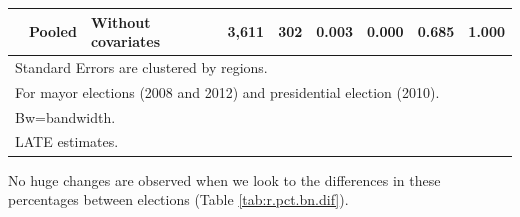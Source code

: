 \documentclass[
  12pt,
]{article}
\begin{document}
\begin{table}[H]
\begin{tabular}[t]{lllrrrrrr}
\multirow{-8}{*}{\raggedright\arraybackslash 2012} & \multirow{-2}{*}{\raggedright\arraybackslash Pooled} & Without covariates & 3,611 & 302 & 0.003 & 0.000 & 0.685 & 1.000\\
\bottomrule
\multicolumn{9}{l}{\rule{0pt}{1em}Standard Errors are clustered by regions.}\\
\multicolumn{9}{l}{\rule{0pt}{1em}For mayor elections (2008 and 2012) and presidential election (2010).}\\
\multicolumn{9}{l}{\rule{0pt}{1em}Bw=bandwidth.}\\
\multicolumn{9}{l}{\rule{0pt}{1em}LATE estimates.}\\
\end{tabular}
\end{table}

No huge changes are observed when we look to the differences in these
percentages between elections (Table \ref{tab:r.pct.bn.dif}).
\end{document}
